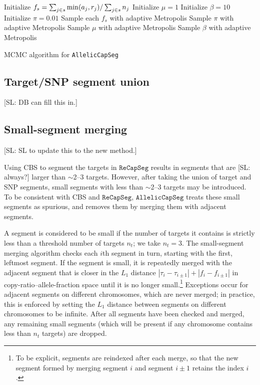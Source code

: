 \documentclass[nofootinbib,amssymb,amsmath]{revtex4}
\newcommand{\RCS}{\texttt{ReCapSeg}}
\newcommand{\ACS}{\texttt{AllelicCapSeg}}
\def\SL#1{{\color [rgb]{0,0,0.8} [SL: #1]}}
\begin{document}
\begin{algorithm}
\begin{algorithmic}[1]
	\State Initialize $f_s = \sum_{j \in s} {\rm min}(a_j, r_j) / \sum_{j \in s} n_j$
\EndFor
\State Initialize $\mu = 1$
\State Initialize $\beta = 10$
\State Initialize $\pi = 0.01$
\Repeat
	\State Sample each $f_s$ with adaptive Metropolis
	\State Sample $\pi$ with adaptive Metropolis
	\State Sample $\mu$ with adaptive Metropolis
	\State Sample $\beta$ with adaptive Metropolis
\end{algorithmic}
\caption{MCMC algorithm for \ACS}
\label{ACS_MCMC}
\end{algorithm}

\subsection{Target/SNP segment union} \label{targetsnp-segment-union}

\SL{DB can fill this in.}

\subsection{Small-segment merging} \label{small-segment-merging}

\SL{SL to update this to the new method.}

Using CBS to segment the targets in $\RCS$ results in segments that are \SL{always?} larger than $\sim$2--3 targets.  However, after taking the union of target and SNP segments, small segments with less than $\sim$2--3 targets may be introduced.  To be consistent with CBS and $\RCS$, $\ACS$ treats these small segments as spurious, and removes them by merging them with adjacent segments.

A segment is considered to be small if the number of targets it contains is strictly less than a threshold number of targets $n_t$; we take $n_t = 3$.  The small-segment merging algorithm checks each $i$th segment in turn, starting with the first, leftmost segment.  If the segment is small, it is repeatedly merged with the adjacent segment that is closer in the $L_1$ distance $|\tau_i - \tau_{i \pm 1}| + |f_i - f_{i \pm 1}|$ in copy-ratio--allele-fraction space until it is no longer small.\footnote{To be explicit, segments are reindexed after each merge, so that the new segment formed by merging segment $i$ and segment $i \pm 1$ retains the index $i$.}  Exceptions occur for adjacent segments on different chromosomes, which are never merged; in practice, this is enforced by setting the $L_1$ distance between segments on different chromosomes to be infinite.  After all segments have been checked and merged, any remaining small segments (which will be present if any chromosome contains less than $n_t$ targets) are dropped.
\end{document}
